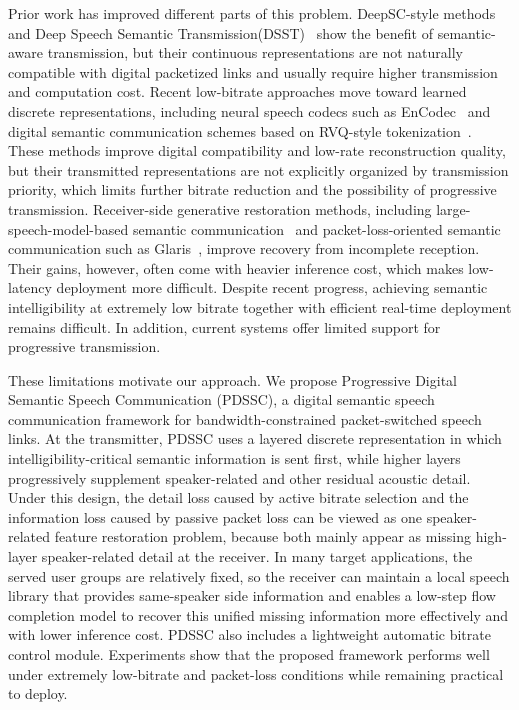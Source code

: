 \documentclass[conference]{IEEEtran}
\begin{document}
Prior work has improved different parts of this problem. DeepSC-style methods and Deep Speech Semantic Transmission(DSST)~\cite{xie2021deepsc,xiao2023dsst} show the benefit of semantic-aware transmission, but their continuous representations are not naturally compatible with digital packetized links and usually require higher transmission and computation cost. Recent low-bitrate approaches move toward learned discrete representations, including neural speech codecs such as EnCodec~\cite{defossez2023encodec} and digital semantic communication schemes based on RVQ-style tokenization~\cite{chen2025rvqgan}. These methods improve digital compatibility and low-rate reconstruction quality, but their transmitted representations are not explicitly organized by transmission priority, which limits further bitrate reduction and the possibility of progressive transmission. Receiver-side generative restoration methods, including large-speech-model-based semantic communication~\cite{tian2025lsm} and packet-loss-oriented semantic communication such as Glaris~\cite{han2025esc}, improve recovery from incomplete reception. Their gains, however, often come with heavier inference cost, which makes low-latency deployment more difficult. Despite recent progress, achieving semantic intelligibility at extremely low bitrate together with efficient real-time deployment remains difficult. In addition, current systems offer limited support for progressive transmission.

These limitations motivate our approach. We propose Progressive Digital Semantic Speech Communication (PDSSC), a digital semantic speech communication framework for bandwidth-constrained packet-switched speech links. At the transmitter, PDSSC uses a layered discrete representation in which intelligibility-critical semantic information is sent first, while higher layers progressively supplement speaker-related and other residual acoustic detail. Under this design, the detail loss caused by active bitrate selection and the information loss caused by passive packet loss can be viewed as one speaker-related feature restoration problem, because both mainly appear as missing high-layer speaker-related detail at the receiver. In many target applications, the served user groups are relatively fixed, so the receiver can maintain a local speech library that provides same-speaker side information and enables a low-step flow completion model to recover this unified missing information more effectively and with lower inference cost. PDSSC also includes a lightweight automatic bitrate control module. Experiments show that the proposed framework performs well under extremely low-bitrate and packet-loss conditions while remaining practical to deploy.
\end{document}
